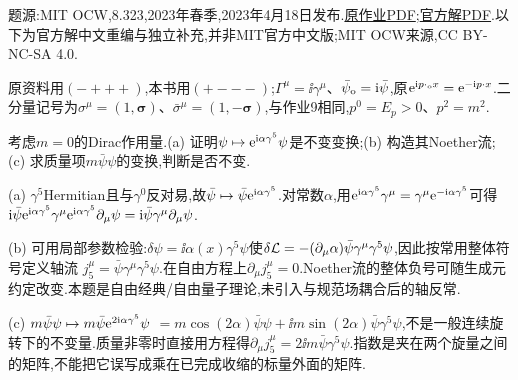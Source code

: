 题源:MIT OCW,8.323,2023年春季,2023年4月18日发布.\href{https://ocw.mit.edu/courses/8-323-relativistic-quantum-field-theory-i-spring-2023/mit8_323_s23_pset10.pdf}{原作业PDF};\href{https://ocw.mit.edu/courses/8-323-relativistic-quantum-field-theory-i-spring-2023/mit8_323_s23_pset_10sol.pdf}{官方解PDF}.以下为官方解中文重编与独立补充,并非MIT官方中文版;MIT OCW来源,CC BY-NC-SA 4.0.

原资料用$(-+++)$,本书用$(+---)$;$\Gamma^\mu=\ii\gamma^\mu$、$\bar\psi_{\rm o}=\mathrm i\bar\psi$,原$\mathrm e^{\mathrm i p\cdot_{\rm o}x}=\mathrm e^{-\mathrm i p\cdot x}$.二分量记号为$\sigma^\mu=(1,\boldsymbol\sigma)$、$\bar\sigma^\mu=(1,-\boldsymbol\sigma)$,与作业9相同,$p^0=E_p>0$、$p^2=m^2$.

\begin{exercise}
考虑$m=0$的Dirac作用量.(a) 证明$\psi\mapsto\mathrm e^{\mathrm i\alpha\gamma^5}\psi$是不变变换;(b) 构造其Noether流;(c) 求质量项$m\bar\psi\psi$的变换,判断是否不变.
\end{exercise}
\begin{solution}
(a) $\gamma^5$Hermitian且与$\gamma^0$反对易,故$\bar\psi\mapsto\bar\psi\mathrm e^{\mathrm i\alpha\gamma^5}$.对常数$\alpha$,用$\mathrm e^{\mathrm i\alpha\gamma^5}\gamma^\mu=\gamma^\mu\mathrm e^{-\mathrm i\alpha\gamma^5}$可得
$\mathrm i\bar\psi\mathrm e^{\mathrm i\alpha\gamma^5}\gamma^\mu\mathrm e^{\mathrm i\alpha\gamma^5}\partial_\mu\psi=\mathrm i\bar\psi\gamma^\mu\partial_\mu\psi$.

(b) 可用局部参数检验:$\delta\psi=\ii\alpha(x)\gamma^5\psi$使$\delta\mathcal L=-(\partial_\mu\alpha)\bar\psi\gamma^\mu\gamma^5\psi$,因此按常用整体符号定义轴流
$j_5^\mu=\bar\psi\gamma^\mu\gamma^5\psi$.在自由方程上$\partial_\mu j_5^\mu=0$.Noether流的整体负号可随生成元约定改变.本题是自由经典/自由量子理论,未引入与规范场耦合后的轴反常.

(c) $m\bar\psi\psi\mapsto m\bar\psi\mathrm e^{2\mathrm i\alpha\gamma^5}\psi$
$=m\cos(2\alpha)\bar\psi\psi+\ii m\sin(2\alpha)\bar\psi\gamma^5\psi$,不是一般连续旋转下的不变量.质量非零时直接用方程得$\partial_\mu j_5^\mu=2\ii m\bar\psi\gamma^5\psi$.指数是夹在两个旋量之间的矩阵,不能把它误写成乘在已完成收缩的标量外面的矩阵.
\end{solution}

